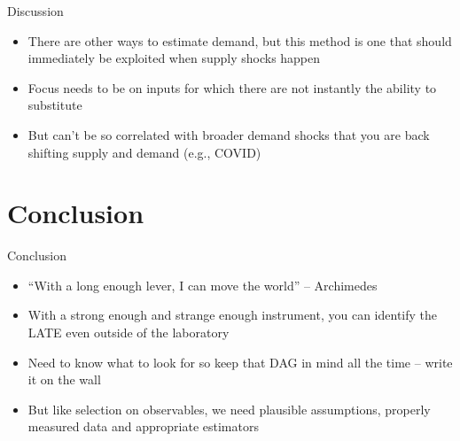 \documentclass{beamer}
\begin{document}
\begin{frame}{Discussion}

\begin{itemize}
\item There are other ways to estimate demand, but this method is one that should immediately be exploited when supply shocks happen
\item Focus needs to be on inputs for which there are not instantly the ability to substitute
\item But can't be so correlated with broader demand shocks that you are back shifting supply and demand (e.g., COVID)
\end{itemize}

\end{frame}

\section{Conclusion}

\begin{frame}{Conclusion}

\begin{itemize}
\item ``With a long enough lever, I can move the world'' -- Archimedes
\item With a strong enough and strange enough instrument, you can identify the LATE even outside of the laboratory
\item Need to know what to look for so keep that DAG in mind all the time -- write it on the wall
\item But like selection on observables, we need plausible assumptions, properly measured data and appropriate estimators
\end{itemize}

\end{frame}
\end{document}
